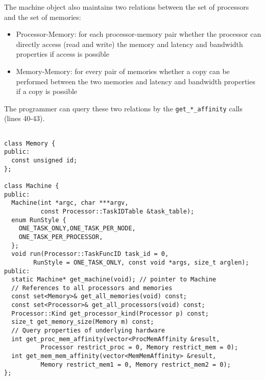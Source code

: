 

The machine object also maintains two relations between the set of processors
and the set of memories:
\begin{itemize}
\item Processor-Memory: for each processor-memory pair whether
the processor can directly access (read and write) the memory and 
latency and bandwidth properties if access is possible
\item Memory-Memory: for every pair of memories whether a copy can be
performed between the two memories and latency and
bandwidth properties if a copy is possible
\end{itemize}

The programmer can query these two relations by the {\tt get\_*\_affinity} calls
(lines 40-43).  


\begin{lstlisting}[float={t},label={lst:machineapi},caption={Machine Interface.}]

class Memory {
public:
  const unsigned id;
};

class Machine {
public:
  Machine(int *argc, char ***argv,
          const Processor::TaskIDTable &task_table);
  enum RunStyle {
    ONE_TASK_ONLY,ONE_TASK_PER_NODE,
    ONE_TASK_PER_PROCESSOR,
  };
  void run(Processor::TaskFuncID task_id = 0, 
        RunStyle = ONE_TASK_ONLY, const void *args, size_t arglen);
public:
  static Machine* get_machine(void); // pointer to Machine
  // References to all processors and memories
  const set<Memory>& get_all_memories(void) const;
  const set<Processor>& get_all_processors(void) const;
  Processor::Kind get_processor_kind(Processor p) const;
  size_t get_memory_size(Memory m) const;
  // Query properties of underlying hardware
  int get_proc_mem_affinity(vector<ProcMemAffinity &result,
          Processor restrict_proc = 0, Memory restrict_mem = 0);
  int get_mem_mem_affinity(vector<MemMemAffinity> &result,
          Memory restrict_mem1 = 0, Memory restrict_mem2 = 0);
};
\end{lstlisting}


